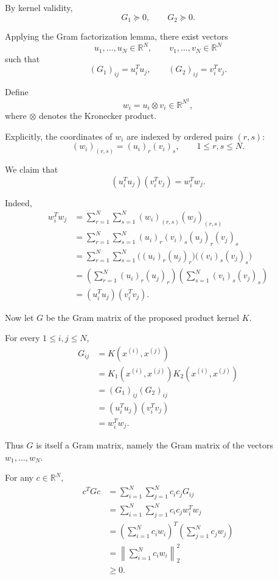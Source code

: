 \documentclass[11pt]{article}
\begin{document}
By kernel validity,
\[
G_1\succeq0,
\qquad G_2\succeq0.
\]

Applying the Gram factorization lemma,
there exist vectors
\[
u_1,\ldots,u_N\in\mathbb R^N,
\qquad
v_1,\ldots,v_N\in\mathbb R^N
\]
such that
\[
(G_1)_{ij}=u_i^Tu_j,
\qquad
(G_2)_{ij}=v_i^Tv_j.
\]

Define
\[
w_i=u_i\otimes v_i\in\mathbb R^{N^2},
\]
where $\otimes$ denotes the Kronecker product.

Explicitly, the coordinates of $w_i$ are indexed
by ordered pairs $(r,s)$:
\[
(w_i)_{(r,s)}
=(u_i)_r(v_i)_s,
\qquad
1\leq r,s\leq N.
\]

We claim that
\[
\boxed{
(u_i^Tu_j)(v_i^Tv_j)=w_i^Tw_j.
}
\]

Indeed,
\[
\begin{aligned}
w_i^Tw_j
&=
\sum_{r=1}^{N}\sum_{s=1}^{N}
(w_i)_{(r,s)}(w_j)_{(r,s)}\\
&=
\sum_{r=1}^{N}\sum_{s=1}^{N}
(u_i)_r(v_i)_s(u_j)_r(v_j)_s\\
&=
\sum_{r=1}^{N}\sum_{s=1}^{N}
\big((u_i)_r(u_j)_r\big)
\big((v_i)_s(v_j)_s\big)\\
&=
\left(\sum_{r=1}^{N}(u_i)_r(u_j)_r\right)
\left(\sum_{s=1}^{N}(v_i)_s(v_j)_s\right)\\
&=(u_i^Tu_j)(v_i^Tv_j).
\end{aligned}
\]

Now let $G$ be the Gram matrix of the proposed
product kernel $K$.

For every $1\leq i,j\leq N$,
\[
\begin{aligned}
G_{ij}
&=K(x^{(i)},x^{(j)})\\
&=K_1(x^{(i)},x^{(j)})
  K_2(x^{(i)},x^{(j)})\\
&=(G_1)_{ij}(G_2)_{ij}\\
&=(u_i^Tu_j)(v_i^Tv_j)\\
&=w_i^Tw_j.
\end{aligned}
\]

Thus $G$ is itself a Gram matrix, namely
the Gram matrix of the vectors $w_1,\ldots,w_N$.

For any $c\in\mathbb R^N$,
\[
\begin{aligned}
c^TGc
&=\sum_{i=1}^{N}\sum_{j=1}^{N}
c_ic_jG_{ij}\\
&=\sum_{i=1}^{N}\sum_{j=1}^{N}
c_ic_jw_i^Tw_j\\
&=
\left(\sum_{i=1}^{N}c_iw_i\right)^T
\left(\sum_{j=1}^{N}c_jw_j\right)\\
&=
\left\|\sum_{i=1}^{N}c_iw_i\right\|_2^2\\
&\geq0.
\end{aligned}
\]
\end{document}
